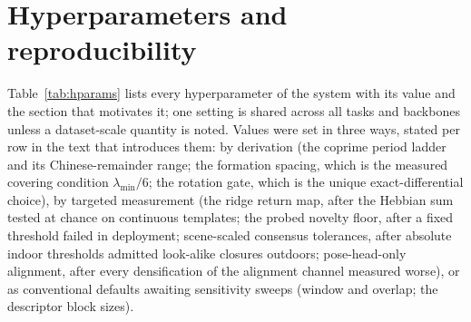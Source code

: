 \section{Hyperparameters and reproducibility}
\label{app:repro}
Table~\ref{tab:hparams} lists every hyperparameter of the system with
its value and the section that motivates it; one setting is shared
across all tasks and backbones unless a dataset-scale quantity is noted.
Values were set in three ways, stated per row in the text that
introduces them: by derivation (the coprime period ladder and its
Chinese-remainder range; the formation spacing, which is the measured
covering condition $\lambda_{\min}/6$; the rotation gate, which is the
unique exact-differential choice), by targeted measurement (the ridge
return map, after the Hebbian sum tested at chance on continuous
templates; the probed novelty floor, after a fixed threshold failed in
deployment; scene-scaled consensus tolerances, after absolute indoor
thresholds admitted look-alike closures outdoors; pose-head-only
alignment, after every densification of the alignment channel measured
worse), or as conventional defaults awaiting sensitivity sweeps (window
and overlap; the descriptor block sizes).

